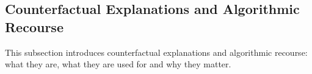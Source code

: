 \subsection{Counterfactual Explanations and Algorithmic Recourse}
\label{sec:bg-recourse}

This subsection introduces counterfactual explanations and algorithmic recourse: what they are,
what they are used for and why they matter.

